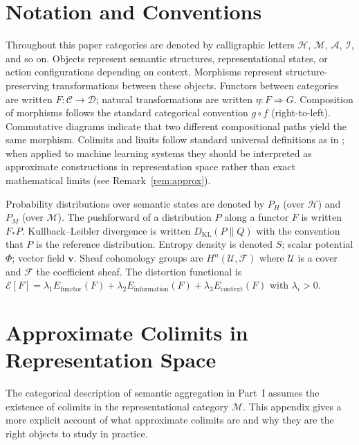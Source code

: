 \documentclass[12pt]{article}
\theoremstyle{definition}
\begin{document}
\section{Notation and Conventions}
\label{app:notation}

Throughout this paper categories are denoted by calligraphic letters
$\mathcal{H}$, $\mathcal{M}$, $\mathcal{A}$, $\mathcal{I}$, and so on. Objects
represent semantic structures, representational states, or action configurations
depending on context. Morphisms represent structure-preserving transformations
between these objects. Functors between categories are written $F : \mathcal{C}
\to \mathcal{D}$; natural transformations are written $\eta : F \Rightarrow G$.
Composition of morphisms follows the standard categorical convention $g \circ f$
(right-to-left). Commutative diagrams indicate that two different compositional
paths yield the same morphism. Colimits and limits follow standard universal
definitions as in \citet{maclane1998,riehl2017}; when applied to machine
learning systems they should be interpreted as approximate constructions in
representation space rather than exact mathematical limits (see
Remark~\ref{rem:approx}).

Probability distributions over semantic states are denoted by $P_H$ (over
$\mathcal{H}$) and $P_M$ (over $\mathcal{M}$). The pushforward of a distribution
$P$ along a functor $F$ is written $F_* P$. Kullback--Leibler divergence is
written $D_{\mathrm{KL}}(P \| Q)$ with the convention that $P$ is the reference
distribution. Entropy density is denoted $S$; scalar potential $\Phi$; vector
field $\mathbf{v}$. Sheaf cohomology groups are $H^n(\mathcal{U}, \mathcal{F})$
where $\mathcal{U}$ is a cover and $\mathcal{F}$ the coefficient sheaf. The
distortion functional is $\mathcal{E}[F] = \lambda_1 E_{\mathrm{functor}}(F) +
\lambda_2 E_{\mathrm{information}}(F) + \lambda_3 E_{\mathrm{context}}(F)$ with
$\lambda_i > 0$.

\section{Approximate Colimits in Representation Space}
\label{app:approx}

The categorical description of semantic aggregation in Part~I assumes the
existence of colimits in the representational category $\mathcal{M}$. This
appendix gives a more explicit account of what approximate colimits are and why
they are the right objects to study in practice.
\end{document}
